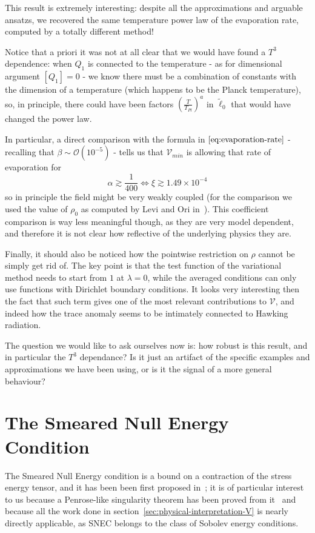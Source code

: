 This result is extremely interesting: despite all the approximations and arguable ansatzs, we recovered the same temperature power law of the evaporation rate, computed by a totally different method! 

\begin{remark}
	Notice that a priori it was not at all clear that we would have found a \(T^3\) dependence: when \(Q_1\) is connected to the temperature - as for dimensional argument \(\left[Q_1\right] = 0\) - we know there must be a combination of constants with the dimension of a temperature (which happens to be the Planck temperature), so, in principle, there could have been factors \(\left(\frac{T}{T_{Pl}}\right)^a\) in \(\tilde{\ell}_0\) that would have changed the power law.
\end{remark}

In particular, a direct comparison with the formula in \(\eqref{eq:evaporation-rate}\) - recalling that  \(\beta \sim \mathcal{O}(10^{-5})\) - tells us that \(\mathcal{V}_{min}\) is allowing that rate of evaporation for 
\[
\alpha \gtrsim \frac{1}{400} \iff \xi \gtrsim 1.49 \times 10^{-4}	
\]
so in principle the field might be very weakly coupled (for the comparison we used the value of \(\rho_0\) as computed by Levi and Ori in~\cite[]{levi2016versatile}). This coefficient comparison is way less meaningful though, as they are very model dependent, and therefore it is not clear how reflective of the underlying physics they are.

Finally, it should also be noticed how the pointwise restriction on \(\rho\) cannot be simply get rid of. The key point is that the test function of the variational method needs to start from \(1\) at \(\lambda = 0\), while the averaged conditions can only use functions with Dirichlet boundary conditions. It looks very interesting then the fact that such term gives one of the most relevant contributions to \(\mathcal{V}\), and indeed how the trace anomaly seems to be intimately connected to Hawking radiation. 

The question we would like to ask ourselves now is: how robust is this result, and in particular the \(T^3\) dependance? Is it just an artifact of the specific examples and approximations we have been using, or is it the signal of a more general behaviour? 

\section{The Smeared Null Energy Condition}
The Smeared Null Energy condition is a bound on a contraction of the stress energy tensor, and it has been been first proposed in~\cite{freivogel2018smeared}; it is of particular interest to us because a Penrose-like singularity theorem has been proved from it~\cite{freivogel2020return} and because all the work done in section~\ref{sec:physical-interpretation-V} is nearly directly applicable, as SNEC belongs to the class of Sobolev energy conditions.

